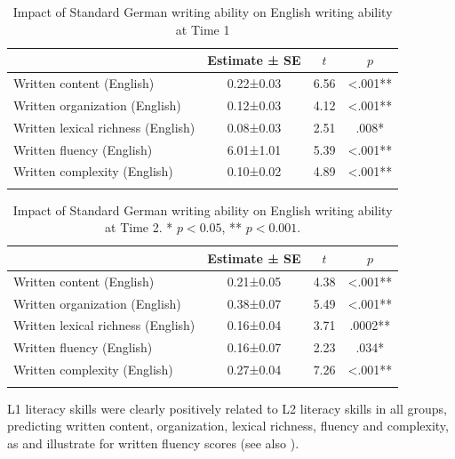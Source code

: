 \documentclass[output=paper,modfonts,nonflat,newtxmath]{langsci/langscibook}
\begin{document}
\begin{table}
\caption{\label{tab:pfenninger:10}Impact of Standard German writing ability on English writing ability at Time 1}
\begin{tabular}{lS[table-format=-1.3,parse-numbers=false]S[table-format=1.2]S[table-format=<1.3,table-space-text-post = ab]}
\lsptoprule
& {Estimate ± SE} & {$t$}  & {$p$}\\\midrule
Written content (English) & 0.22±0.03 & 6.56 & <.001**\\
Written organization (English) & 0.12±0.03 & 4.12 & <.001**\\
Written lexical richness (English) & 0.08±0.03 & 2.51 & .008*\\
Written fluency (English) & 6.01±1.01 & 5.39 & <.001**\\
Written complexity (English) & 0.10±0.02 & 4.89 & <.001**\\
\lspbottomrule
\end{tabular}
\end{table}

\begin{table}
\caption{\label{tab:pfenninger:11}Impact of Standard German writing ability on English writing ability at Time 2. * $p<0.05$, ** $p<0.001$.}
\begin{tabular}{lS[table-format=-1.3,parse-numbers=false]S[table-format=1.2]S[table-format=<1.4,table-space-text-post = ab]}
\lsptoprule
& {Estimate ± SE} & {$t$}  & {$p$}\\\midrule
Written content (English) & 0.21±0.05 & 4.38 & <.001**\\
Written organization (English) & 0.38±0.07 & 5.49 & <.001**\\
Written lexical richness (English) & 0.16±0.04 & 3.71 & .0002**\\
Written fluency (English) & 0.16±0.07 & 2.23 & .034*\\
Written complexity (English) & 0.27±0.04 & 7.26 & <.001**\\
\lspbottomrule
\end{tabular}
\end{table}


L1 literacy skills were clearly positively related to L2 literacy skills in all groups, predicting written content, organization, lexical richness, fluency and complexity, as  and  illustrate for written fluency scores (see also \citealt{Pfenninger2014}).
\end{document}
